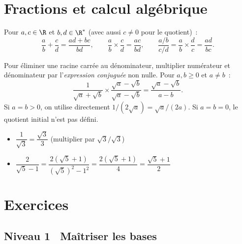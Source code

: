 \section{Fractions et calcul alg\'ebrique}

\begin{prop}
Pour $a,c\in\R$ et $b,d\in\R^*$ (avec aussi $c\ne0$ pour le quotient)~:
$$\frac{a}{b} + \frac{c}{d} = \frac{ad+bc}{bd},\qquad
  \frac{a}{b} \times \frac{c}{d} = \frac{ac}{bd},\qquad
  \frac{a/b}{c/d} = \frac{a}{b} \times \frac{d}{c} = \frac{ad}{bc}.$$
\end{prop}

\begin{methode}
Pour \'eliminer une racine carr\'ee au d\'enominateur, multiplier num\'erateur
et d\'enominateur par l'\emph{expression conjugu\'ee} non nulle.
Pour $a,b\geq0$ et $a\ne b$~:
$$\frac{1}{\sqrt{a}+\sqrt{b}} \times \frac{\sqrt{a}-\sqrt{b}}{\sqrt{a}-\sqrt{b}}
  = \frac{\sqrt{a}-\sqrt{b}}{a-b}.$$
Si $a=b>0$, on utilise directement $1/(2\sqrt a)=\sqrt a/(2a)$.
Si $a=b=0$, le quotient initial n'est pas d\'efini.
\end{methode}

\begin{ex}[Rationalisations]
\begin{itemize}
  \item $\dfrac{1}{\sqrt{3}} = \dfrac{\sqrt{3}}{3}$ \quad
        (multiplier par $\sqrt{3}/\sqrt{3}$)
  \item $\dfrac{2}{\sqrt{5}-1} = \dfrac{2(\sqrt{5}+1)}{(\sqrt{5})^2-1^2}
        = \dfrac{2(\sqrt{5}+1)}{4} = \dfrac{\sqrt{5}+1}{2}$
\end{itemize}
\end{ex}

\section{Exercices}

\subsection*{\quad Niveau 1 \textemdash\ Ma\^itriser les bases}

